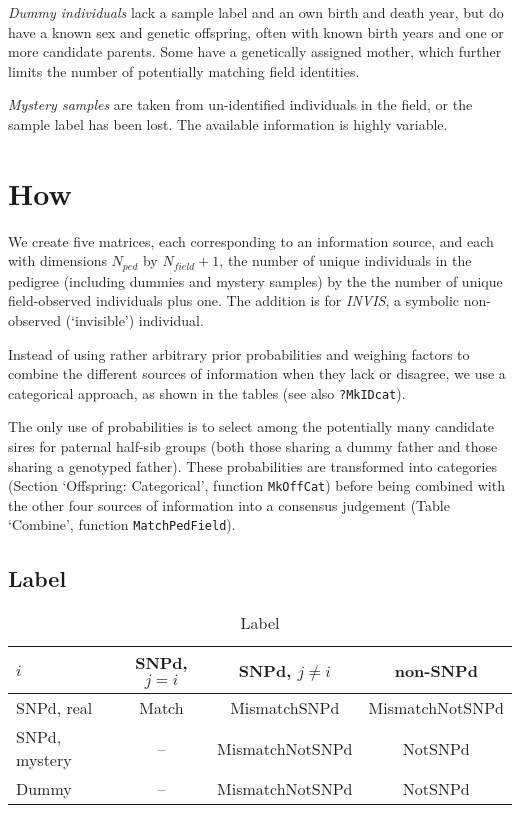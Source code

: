 \documentclass[a4paper, 12pt]{article}
\begin{document}
\emph{Dummy individuals} lack a sample label and an own birth and death year, but do have a known sex and genetic offspring, often with known birth years and one or more candidate parents. Some have a genetically assigned mother, which further limits the number of potentially matching field identities.

\emph{Mystery samples} are taken from un-identified individuals in the field, or the sample label has been lost. The available information is highly variable.



\section{How}
We create five matrices, each corresponding to an information source, and each with dimensions $N_{ped}$ by $N_{field} +1$, the number of unique individuals in the pedigree (including dummies and mystery samples) by the the number of unique field-observed individuals plus one. The addition is for \emph{INVIS}, a symbolic non-observed (`invisible') individual.

Instead of using rather arbitrary prior probabilities and weighing factors to combine the different sources of information when they lack or disagree, we use a categorical approach, as shown in the tables (see also \verb+?MkIDcat+).

The only use of probabilities is to select among the potentially many candidate sires for paternal half-sib groups (both those sharing a dummy father and those sharing a genotyped father). These probabilities are transformed into categories (Section `Offspring: Categorical', function \verb+MkOffCat+) before being combined with the other four sources of information into a consensus judgement (Table `Combine', function \verb+MatchPedField+).

\subsection{Label}

\begin{table}[htbp]
\caption{Label}
	\centering
		\begin{tabular}{l|ccc}
			\hline
			$i$ & SNPd, $j=i$ & SNPd, $j\neq i$ & non-SNPd \\
			\hline
			SNPd, real & Match & MismatchSNPd & MismatchNotSNPd \\
			SNPd, mystery & -- & MismatchNotSNPd & NotSNPd \\
			Dummy & -- & MismatchNotSNPd & NotSNPd \\
			\hline
		\end{tabular}
\end{table}
\end{document}
